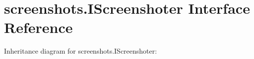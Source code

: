 \hypertarget{interfacescreenshots_1_1_i_screenshoter}{}\section{screenshots.\+I\+Screenshoter Interface Reference}
\label{interfacescreenshots_1_1_i_screenshoter}


Inheritance diagram for screenshots.\+I\+Screenshoter\+:
